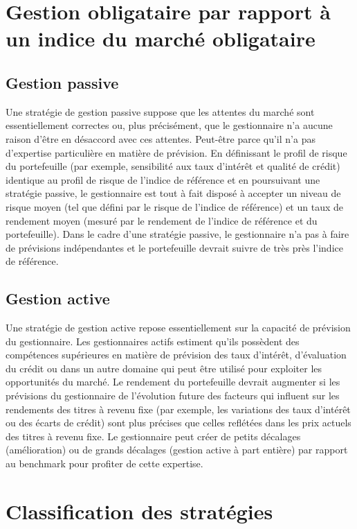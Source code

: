 \documentclass[12pt]{article}
\begin{document}
\section{Gestion obligataire par rapport à un indice du marché obligataire}
\subsection{Gestion passive}
Une stratégie de gestion passive suppose que les attentes du marché sont essentiellement correctes ou, plus précisément, que le gestionnaire n’a aucune raison d’être en désaccord avec ces attentes.  Peut-être parce qu’il n’a pas d’expertise particulière en matière de prévision. En définissant le profil de risque du portefeuille (par exemple, sensibilité aux taux d'intérêt et qualité de crédit) identique au profil de risque de l'indice de référence et en poursuivant une stratégie passive, le gestionnaire est tout à fait disposé à accepter un niveau de risque moyen (tel que défini par le risque de l'indice de référence) et un taux de rendement moyen (mesuré par le rendement de l'indice de référence et du portefeuille). Dans le cadre d'une stratégie passive, le gestionnaire n'a pas à faire de prévisions indépendantes et le portefeuille devrait suivre de très près l'indice de référence.
\subsection{Gestion active}
Une stratégie de gestion active repose essentiellement sur la capacité de prévision du gestionnaire. Les gestionnaires actifs estiment qu'ils possèdent des compétences supérieures en matière de prévision des taux d'intérêt, d'évaluation du crédit ou dans un autre domaine qui peut être utilisé pour exploiter les opportunités du marché. Le rendement du portefeuille devrait augmenter si les prévisions du gestionnaire de l’évolution future des facteurs qui influent sur les rendements des titres à revenu fixe (par exemple, les variations des taux d’intérêt ou des écarts de crédit) sont plus précises que celles reflétées dans les prix actuels des titres à revenu fixe.  Le gestionnaire peut créer de petits décalages (amélioration) ou de grands décalages (gestion active à part entière) par rapport au benchmark pour profiter de cette expertise.

\section{Classification des stratégies}
\end{document}
